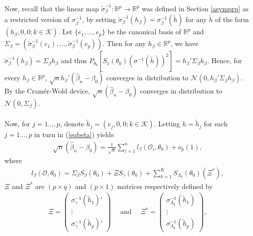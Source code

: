 \documentclass{statsoc}
\begin{document}
Now, recall that the linear map $\widetilde \sigma_\beta^{-1}:{\ensuremath{\mathbb{R}}}^p\rightarrow {\ensuremath{\mathbb{R}}}^p$ was defined in Section \ref{asymprp} as a restricted version of $\sigma_\beta^{-1}$, by setting $\widetilde \sigma_\beta^{-1} (h_\beta)= \sigma_\beta^{-1} (\widetilde h)$ for any $\widetilde h$ of the form $(h_\beta, 0, 0; k\in\mathcal K)$. Let $\{e_1,\ldots,e_p\}$ be the canonical basis of ${\ensuremath{\mathbb{R}}}^p$ and $\Sigma_\beta=(\widetilde \sigma_\beta^{-1}(e_1),\ldots,\widetilde \sigma_\beta^{-1}(e_p))$. Then for any $h_\beta\in{\ensuremath{\mathbb{R}}}^p$, we have $\widetilde \sigma_\beta^{-1}(h_\beta)=\Sigma_\beta h_\beta$ and thus $P_{\theta_0}[ S_1(\theta_0) (\sigma^{-1}(\widetilde h))^2]=h_\beta'\Sigma_\beta h_\beta$. Hence, for every $h_\beta\in{\ensuremath{\mathbb{R}}}^p$, $\sqrt n h_\beta'(\widehat\beta_n-\beta_0)$ converges in distribution to $\mathcal N(0,h_\beta'\Sigma_\beta h_\beta)$. By the Cram\'er-Wold device, $\sqrt n(\widehat\beta_n-\beta_0)$ converges in distribution to $\mathcal N(0,\Sigma_\beta)$.
\\\\
Now, for $j=1\ldots,p$, denote $\widetilde h_j=(e_j,0,0; k\in\mathcal K)$. Letting $h=\widetilde h_j$ for each $j=1\ldots,p$ in turn in (\ref{eqbeta}) yields
\begin{eqnarray*}
\sqrt n(\widehat\beta_n-\beta_0)=\frac{1}{\sqrt n}\sum_{i=1}^n l_\beta(\mathcal O_i, \theta_0)+o_p(1),
\end{eqnarray*}
where
\begin{eqnarray*}
l_\beta(\mathcal O, \theta_0)=\Sigma_\beta S_\beta(\theta_0)+\Xi S_\gamma(\theta_0)+\sum_{k=1}^K S_{\Lambda_k}(\theta_0)(\Xi^\ast),
\end{eqnarray*}
$\Xi$ and $\Xi^\ast$ are $(p\times q)$ and $(p\times 1)$ matrices respectively defined by
\begin{eqnarray*}
\Xi=\left(
\begin{array}{c}
\sigma_\gamma^{-1}(\widetilde h_1)'\\
\vdots\\
\sigma_\gamma^{-1}(\widetilde h_p)'
\end{array}\right) \quad\mbox{ and }\quad 
\Xi^\ast=\left(
\begin{array}{c}
\sigma_{\Lambda_k}^{-1}(\widetilde h_1)\\
\vdots\\
\sigma_{\Lambda_k}^{-1}(\widetilde h_p)
\end{array}\right),
\end{eqnarray*}
\end{document}
